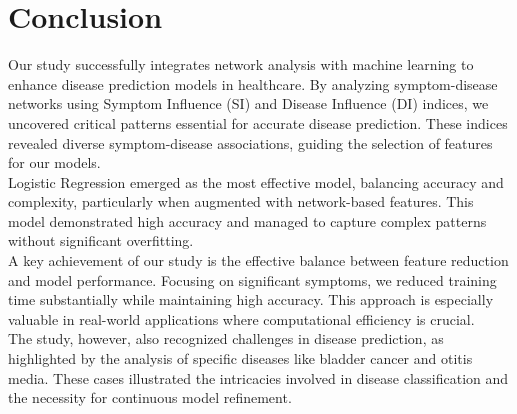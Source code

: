 \section{Conclusion}

Our study successfully integrates network analysis with machine learning to enhance disease prediction models in healthcare.
By analyzing symptom-disease networks using Symptom Influence (SI) and Disease Influence (DI) indices, we uncovered
critical patterns essential for accurate disease prediction. These indices revealed diverse symptom-disease associations,
guiding the selection of features for our models.\\
Logistic Regression emerged as the most effective model, balancing accuracy and complexity, particularly when augmented with network-based features.
This model demonstrated high accuracy and managed to capture complex patterns without significant overfitting.\\
A key achievement of our study is the effective balance between feature reduction and model performance.
Focusing on significant symptoms, we reduced training time substantially while maintaining high accuracy.
This approach is especially valuable in real-world applications where computational efficiency is crucial.\\
The study, however, also recognized challenges in disease prediction, as highlighted by the analysis of specific
diseases like bladder cancer and otitis media. These cases illustrated the intricacies involved in disease classification
and the necessity for continuous model refinement.